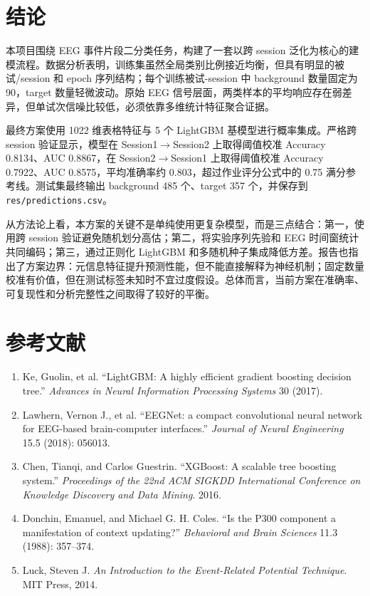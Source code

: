 \chapter{结论}

本项目围绕 EEG 事件片段二分类任务，构建了一套以跨 session 泛化为核心的建模流程。数据分析表明，训练集虽然全局类别比例接近均衡，但具有明显的被试/session 和 epoch 序列结构；每个训练被试-session 中 background 数量固定为 90，target 数量轻微波动。原始 EEG 信号层面，两类样本的平均响应存在弱差异，但单试次信噪比较低，必须依靠多维统计特征聚合证据。

最终方案使用 1022 维表格特征与 5 个 LightGBM 基模型进行概率集成。严格跨 session 验证显示，模型在 Session1$\rightarrow$Session2 上取得阈值校准 Accuracy 0.8134、AUC 0.8867，在 Session2$\rightarrow$Session1 上取得阈值校准 Accuracy 0.7922、AUC 0.8575，平均准确率约 0.803，超过作业评分公式中的 0.75 满分参考线。测试集最终输出 background 485 个、target 357 个，并保存到 \texttt{res/predictions.csv}。

从方法论上看，本方案的关键不是单纯使用更复杂模型，而是三点结合：第一，使用跨 session 验证避免随机划分高估；第二，将实验序列先验和 EEG 时间窗统计共同编码；第三，通过正则化 LightGBM 和多随机种子集成降低方差。报告也指出了方案边界：元信息特征提升预测性能，但不能直接解释为神经机制；固定数量校准有价值，但在测试标签未知时不宜过度假设。总体而言，当前方案在准确率、可复现性和分析完整性之间取得了较好的平衡。

\chapter{参考文献}

\begin{enumerate}
  \item Ke, Guolin, et al. ``LightGBM: A highly efficient gradient boosting decision tree.'' \textit{Advances in Neural Information Processing Systems} 30 (2017).
  \item Lawhern, Vernon J., et al. ``EEGNet: a compact convolutional neural network for EEG-based brain-computer interfaces.'' \textit{Journal of Neural Engineering} 15.5 (2018): 056013.
  \item Chen, Tianqi, and Carlos Guestrin. ``XGBoost: A scalable tree boosting system.'' \textit{Proceedings of the 22nd ACM SIGKDD International Conference on Knowledge Discovery and Data Mining}. 2016.
  \item Donchin, Emanuel, and Michael G. H. Coles. ``Is the P300 component a manifestation of context updating?'' \textit{Behavioral and Brain Sciences} 11.3 (1988): 357--374.
  \item Luck, Steven J. \textit{An Introduction to the Event-Related Potential Technique}. MIT Press, 2014.
\end{enumerate}
